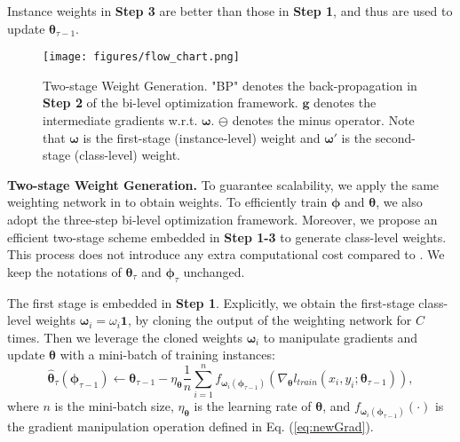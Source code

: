 %
Instance weights in \textbf{Step 3} are better than those in \textbf{Step 1}, and thus are used to update $\boldsymbol \theta_{\tau-1}$.
%
\begin{figure}
    \centering
    \texttt{[image: figures/flow\_chart.png]}
    \caption{Two-stage Weight Generation. "BP" denotes the back-propagation in \textbf{Step 2} of the bi-level optimization framework. $\mathbf g$ denotes the intermediate gradients w.r.t. $\boldsymbol \omega$. $\ominus$ denotes the minus operator. Note that $\boldsymbol \omega$ is the first-stage (instance-level) weight and $\boldsymbol \omega'$ is the second-stage (class-level) weight.}
    \label{fig:flowChart}
\end{figure}

\textbf{Two-stage Weight Generation.} 
%
To guarantee scalability, we apply the same weighting network in \cite{shuMetaWeightNetLearningExplicit2019a} to obtain weights.
%
To efficiently train $\boldsymbol \phi$ and $\boldsymbol \theta$, we also adopt the three-step bi-level optimization framework.
%
Moreover, we propose an efficient two-stage scheme embedded in \textbf{Step 1-3} to generate class-level weights.
%
This process does not introduce any extra computational cost compared to \cite{shuMetaWeightNetLearningExplicit2019a}.
%
We keep the notations of $\boldsymbol \theta_\tau$ and $\boldsymbol \phi_\tau$ unchanged.

%
The first stage is embedded in \textbf{Step 1}.
%
Explicitly, we obtain the first-stage class-level weights $\boldsymbol \omega_i = \omega_i \boldsymbol 1$, by cloning the output of the weighting network for $C$ times.
%
Then we leverage the cloned weights $\boldsymbol \omega_i$ to manipulate gradients and update $\boldsymbol \theta$ with a mini-batch of training instances:
\begin{equation}
    \label{eq:thetaHat}
    \hat {\boldsymbol\theta}_\tau \left(\boldsymbol \phi _{\tau-1}\right) \leftarrow \boldsymbol \theta_{\tau-1} - \eta_{\boldsymbol \theta} \frac{1}{n}\sum_{i=1}^{n}f_{\boldsymbol \omega _i\left(\boldsymbol \phi _{\tau-1}\right)} \left(\nabla_{\boldsymbol \theta} l_{train}(x_i, y_i;\boldsymbol \theta_{\tau-1})\right),
\end{equation}
where $n$ is the mini-batch size, $\eta_{\boldsymbol \theta}$ is the learning rate of $\boldsymbol \theta$, and $f_{\boldsymbol \omega _i\left(\boldsymbol \phi _{\tau - 1} \right)}(\cdot)$ is the gradient manipulation operation defined in Eq. (\ref{eq:newGrad}).

